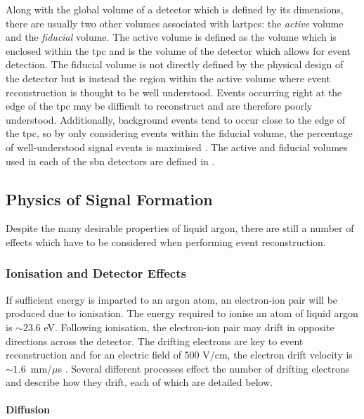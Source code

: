 Along with the global volume of a detector which is defined by its dimensions, there are usually two other volumes associated with \glspl{lartpc}: the \textit{active} volume and the \textit{fiducial} volume. The active volume is defined as the volume which is enclosed within the \gls{tpc} and is the volume of the detector which allows for event detection. The fiducial volume is not directly defined by the physical design of the detector but is instead the region within the active volume where event reconstruction is thought to be well understood. Events occurring right at the edge of the \gls{tpc} may be difficult to reconstruct and are therefore poorly understood. Additionally, background events tend to occur close to the edge of the \gls{tpc}, so by only considering events within the fiducial volume, the percentage of well-understood signal events is maximised \cite{PDG_2022}. The active and fiducial volumes used in each of the \gls{sbn} detectors are defined in .


\subsection{Physics of Signal Formation}

Despite the many desirable properties of liquid argon, there are still a number of effects which have to be considered when performing event reconstruction.

\subsubsection{Ionisation and Detector Effects}
If sufficient energy is imparted to an argon atom, an electron-ion pair will be produced due to ionisation. The energy required to ionise an atom of liquid argon is $\sim23.6$ eV. Following ionisation, the electron-ion pair may drift in opposite directions across the detector. The drifting electrons are key to event reconstruction and for an electric field of 500 V/cm, the electron drift velocity is \mbox{$\sim1.6$ mm/$\mu$s} \cite{electron_drift_velocity}. Several different processes effect the number of drifting electrons and describe how they drift, each of which are detailed below.  




\paragraph{Diffusion}

